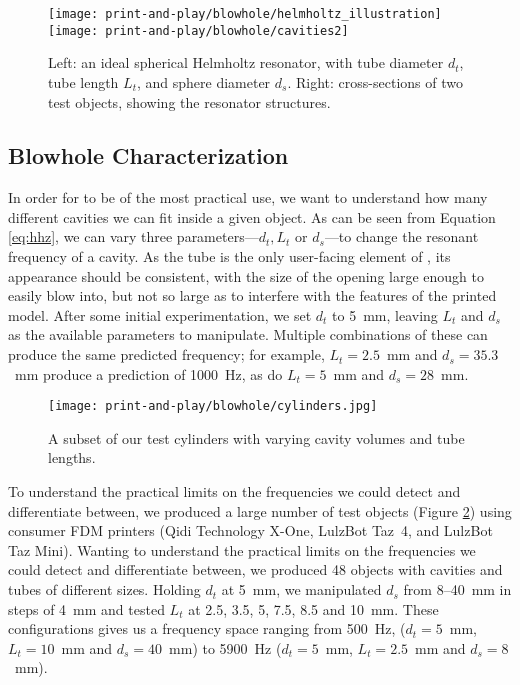       \begin{figure}
        \centering
        \texttt{[image: print-and-play/blowhole/helmholtz\_illustration]}
        \quad
        \texttt{[image: print-and-play/blowhole/cavities2]}
        \caption{Left: an ideal spherical Helmholtz resonator, with tube
          diameter $d_t$, tube length $L_t$, and sphere diameter $d_s$. Right:
          cross-sections of two \bh test objects, showing the resonator
          structures.}
        \label{fig:resonator}
      \end{figure}         

    \subsection{Blowhole Characterization} \label{sec:charac}
      In order for \bh to be of the most practical use, we want to understand
      how many different cavities we can fit inside a given object. As can be
      seen from Equation \ref{eq:hhz}, we can vary three parameters---$d_t, L_t$ or
      $d_s$---to change the resonant frequency of a \bh cavity. As the tube is
      the only user-facing element of \bh, its appearance should be consistent,
      with the size of the opening large enough to easily blow into, but not so
      large as to interfere with the features of the printed model. After some
      initial experimentation, we set $d_t$ to 5~mm, leaving $L_t$ and $d_s$ as
      the available parameters to manipulate. Multiple combinations of these can
      produce the same predicted frequency; for example, $L_t=2.5$~mm and
      $d_s=35.3$~mm produce a prediction of 1000~Hz, as do $L_t=5$~mm and
      $d_s=28$~mm.
      
      \begin{figure}
        \centering
        \texttt{[image: print-and-play/blowhole/cylinders.jpg]}
        \caption{A subset of our test cylinders with varying cavity volumes and
          tube lengths.}
        \label{fig:cylinders}
      \end{figure}
      
      To understand the practical limits on the frequencies we could detect and
      differentiate between, we produced a large number of test objects (Figure
      \ref{fig:cylinders}) using consumer FDM printers (Qidi Technology X-One,
      LulzBot Taz~4, and LulzBot Taz Mini). Wanting to understand the practical
      limits on the frequencies we could detect and differentiate between, we
      produced 48 objects with cavities and tubes of different sizes. Holding
      $d_t$ at 5~mm, we manipulated $d_s$ from 8--40~mm in steps of 4~mm and
      tested $L_t$ at 2.5, 3.5, 5, 7.5, 8.5 and 10~mm. These configurations
      gives us a frequency space ranging from 500~Hz, ($d_t=5$~mm, $L_t=10$~mm
      and $d_s=40$~mm) to 5900~Hz ($d_t=5$~mm, $L_t=2.5$~mm and $d_s=8$~mm).
          
